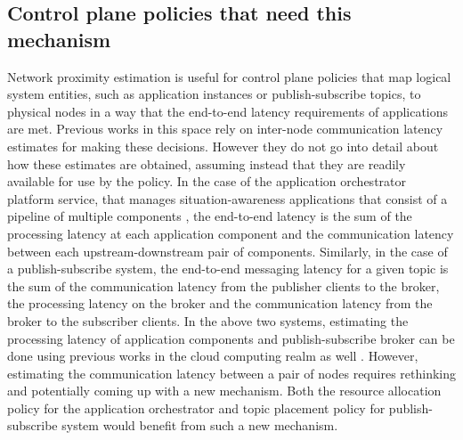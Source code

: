\subsection{Control plane policies that need this mechanism}
Network proximity estimation is useful for control plane policies that map logical system entities, such as application instances or publish-subscribe topics, to physical nodes in a way that the end-to-end latency requirements of applications are met. Previous works in this space \cite{amarasinghe2018data,naas2017ifogstor,liu2019mobility} rely on inter-node communication latency estimates for making these decisions. However they do not go into detail about how these estimates are obtained, assuming instead that they are readily available for use by the policy. In the case of the application orchestrator platform service, that manages situation-awareness applications that consist of a pipeline of multiple components \cite{ananthanarayanan2017real,das2018edgebench}, the end-to-end latency is the sum of the processing latency at each application component and the communication latency between each upstream-downstream pair of components. Similarly, in the case of a publish-subscribe system, the end-to-end messaging latency for a given topic is the sum of the communication latency from the publisher clients to the broker, the processing latency on the broker and the communication latency from the broker to the subscriber clients. In the above two systems, estimating the processing latency of application components and publish-subscribe broker can be done using previous works in the cloud computing realm as well \cite{khare2018scalable}. However, estimating the communication latency between a pair of nodes requires rethinking and potentially coming up with a new mechanism. Both the resource allocation policy for the application orchestrator and topic placement policy for publish-subscribe system would benefit from such a new mechanism.

